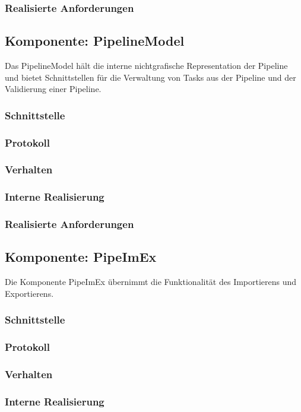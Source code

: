\documentclass[a4paper,12pt]{scrartcl}
\begin{document}
\subsubsection{Realisierte Anforderungen}

\newpage
\subsection{Komponente: PipelineModel}
Das PipelineModel hält die interne nichtgrafische Representation der Pipeline und bietet Schnittstellen für die Verwaltung von Tasks aus der Pipeline und der Validierung einer Pipeline. 
\subsubsection{Schnittstelle}
\subsubsection{Protokoll}
\subsubsection{Verhalten}
\subsubsection{Interne Realisierung}
\subsubsection{Realisierte Anforderungen}


\subsection{Komponente: PipeImEx}
Die Komponente PipeImEx übernimmt die Funktionalität des Importierens und Exportierens.
\subsubsection{Schnittstelle}
\subsubsection{Protokoll}
\subsubsection{Verhalten}
\subsubsection{Interne Realisierung}
\end{document}
